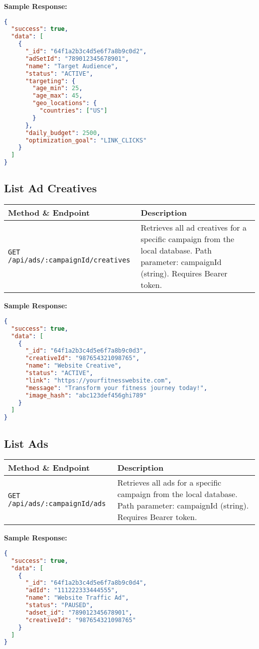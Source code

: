 \documentclass[11pt,a4paper]{article}
\begin{document}
\textbf{Sample Response:}
\begin{lstlisting}[language=json]
{
  "success": true,
  "data": [
    {
      "_id": "64f1a2b3c4d5e6f7a8b9c0d2",
      "adSetId": "789012345678901",
      "name": "Target Audience",
      "status": "ACTIVE",
      "targeting": {
        "age_min": 25,
        "age_max": 45,
        "geo_locations": {
          "countries": ["US"]
        }
      },
      "daily_budget": 2500,
      "optimization_goal": "LINK_CLICKS"
    }
  ]
}
\end{lstlisting}

\subsection{List Ad Creatives}
\begin{longtable}{L{3cm}Y}
\toprule
\textbf{Method \& Endpoint} & \textbf{Description} \\
\midrule
\texttt{GET /api/ads/:campaignId/creatives} & Retrieves all ad creatives for a specific campaign from the local database. Path parameter: campaignId (string). Requires Bearer token. \\
\bottomrule
\end{longtable}

\textbf{Sample Response:}
\begin{lstlisting}[language=json]
{
  "success": true,
  "data": [
    {
      "_id": "64f1a2b3c4d5e6f7a8b9c0d3",
      "creativeId": "987654321098765",
      "name": "Website Creative",
      "status": "ACTIVE",
      "link": "https://yourfitnesswebsite.com",
      "message": "Transform your fitness journey today!",
      "image_hash": "abc123def456ghi789"
    }
  ]
}
\end{lstlisting}

\subsection{List Ads}
\begin{longtable}{L{3cm}Y}
\toprule
\textbf{Method \& Endpoint} & \textbf{Description} \\
\midrule
\texttt{GET /api/ads/:campaignId/ads} & Retrieves all ads for a specific campaign from the local database. Path parameter: campaignId (string). Requires Bearer token. \\
\bottomrule
\end{longtable}

\textbf{Sample Response:}
\begin{lstlisting}[language=json]
{
  "success": true,
  "data": [
    {
      "_id": "64f1a2b3c4d5e6f7a8b9c0d4",
      "adId": "111222333444555",
      "name": "Website Traffic Ad",
      "status": "PAUSED",
      "adset_id": "789012345678901",
      "creativeId": "987654321098765"
    }
  ]
}
\end{lstlisting}
\end{document}
